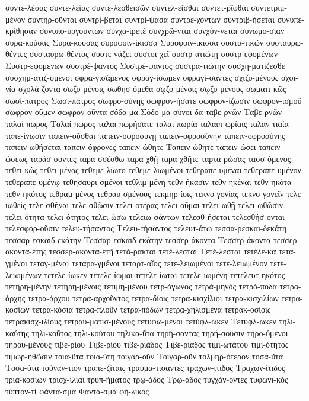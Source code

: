 {συντε-λέσας
συντε-λείας
συντε-λεσθεισῶν
συντελ-εῖσθαι
συντετ-ρῖφθαι
συντετριμ-μένον
συντηρ-οῦνται
συντρί-βεται
συντρί-ψασα
συντρε-χόντων
συντριβ-ήσεται
συνυπε-κρίθησαν
συνυπο-υργούντων
συνχα-ίρετέ
συνχρῶ-νται
συνχύν-νεται
συνωμο-σίαν
συρα-κούσας
Συρα-κούσας
συροφοιν-ίκισσα
Συροφοιν-ίκισσα
συστα-τικῶν
συσταυρω-θέντες
συσταυρω-θέντος
συστε-νάζει
συστοι-χεῖ
συστρ-ατιώτῃ
συστρ-εφομένων
Συστρ-εφομένων
συστρέ-ψαντος
Συστρέ-ψαντος
συστρα-τιώτην
συσχη-ματίζεσθε
συσχημ-ατιζ-όμενοι
σφρα-γισάμενος
σφραγ-ίσωμεν
σφραγί-σαντες
σχιζο-μένους
σχοι-νία
σχολά-ζοντα
σωζο-μένοις
σωθησ-όμεθα
σῳζο-μένοις
σῳζο-μένους
σωματι-κῶς
σωσί-πατρος
Σωσί-πατρος
σωφρο-σύνης
σωφρον-ήσατε
σωφρον-ίζωσιν
σωφρον-ισμοῦ
σωφρον-οῦμεν
σωφρον-οῦντα
σόδο-μα
Σόδο-μα
σύνοι-δα
ταβε-ρνῶν
Ταβε-ρνῶν
ταλαί-πωρος
Ταλαί-πωρος
ταλαι-πωρήσατε
ταλαι-πωρία
ταλαιπ-ωρίαις
ταλαν-τιαία
ταπε-ίνωσιν
ταπειν-οῦσθαι
ταπειν-οφροσύνῃ
ταπειν-οφροσύνην
ταπειν-οφροσύνης
ταπειν-ωθήσεται
ταπειν-όφρονες
ταπειν-ώθητε
Ταπειν-ώθητε
ταπειν-ώσει
ταπειν-ώσεως
ταράσ-σοντες
ταρα-σσέσθω
ταρα-χθῇ
ταρα-χθῆτε
ταρτα-ρώσας
τασσ-όμενος
τεθει-κώς
τεθει-μένος
τεθεμε-λίωτο
τεθεμε-λιωμένοι
τεθεραπε-υμέναι
τεθεραπε-υμένον
τεθεραπε-υμένῳ
τεθησαυρι-σμένοι
τεθλιμ-μένη
τεθν-ήκασιν
τεθν-ηκέναι
τεθν-ηκότα
τεθν-ηκότος
τεθραμ-μένος
τεθραυ-σμένους
τεκμηρ-ίοις
τεκνο-γονίας
τεκνο-γονεῖν
τελε-ιωθεὶς
τελε-σθῆναι
τελε-σθῶσιν
τελει-οτέρας
τελει-οῦμαι
τελει-ωθῇ
τελει-ωθῶσιν
τελει-ότητα
τελει-ότητος
τελει-ώσω
τελειω-σάντων
τελεσθ-ήσεται
τελεσθήσ-ονται
τελεσφορ-οῦσιν
τελευ-τήσαντος
Τελευ-τήσαντος
τελευτ-άτω
τεσσα-ρεσκαι-δεκάτη
τεσσαρ-εσκαιδ-εκάτην
Τεσσαρ-εσκαιδ-εκάτην
τεσσερ-άκοντα
Τεσσερ-άκοντα
τεσσερ-ακοντα-έτης
τεσσερ-ακοντα-ετῆ
τετά-ρακται
τετέ-λεσται
Τετέ-λεσται
τετέλε-κα
τετα-γμένοι
τεταγ-μέναι
τεταρα-γμένοι
τεταρτ-αῖος
τετε-λειωμένοι
τετε-λειωμένον
τετε-λειωμένων
τετελε-ίωκεν
τετελε-ίωμαι
τετελε-ίωται
τετελε-ιωμένη
τετελευτ-ηκότος
τετηρη-μένην
τετηρη-μένοις
τετιμη-μένου
τετρ-άγωνος
τετρά-μηνός
τετρά-ποδα
τετρα-άρχης
τετρα-άρχου
τετρα-αρχοῦντος
τετρα-δίοις
τετρα-κισχίλιοι
τετρα-κισχιλίων
τετρα-κοσίων
τετρα-κόσια
τετρα-πλοῦν
τετρα-πόδων
τετρα-χηλισμένα
τετρακ-οσίοις
τετρακισχ-ιλίους
τετραυ-ματισ-μένους
τετυφω-μένοι
τετύφλ-ωκεν
Τετύφλ-ωκεν
τηλι-καύτης
τηλι-κοῦτος
τηλι-κούτου
τηλικα-ῦτα
τηρή-σαντας
τηρή-σουσιν
τηρο-ύμενοι
τηρου-μένους
τιβε-ρίου
Τιβε-ρίου
τιβε-ριάδος
Τιβε-ριάδος
τιμι-ωτάτου
τιμι-ότητος
τιμωρ-ηθῶσιν
τοια-ῦτα
τοια-ύτη
τοιγαρ-οῦν
Τοιγαρ-οῦν
τολμηρ-ότερον
τοσα-ῦτα
Τοσα-ῦτα
τοὐναν-τίον
τραπε-ζίταις
τραυμα-τίσαντες
τραχων-ίτιδος
Τραχων-ίτιδος
τρια-κοσίων
τρισχ-ίλιαι
τρυπ-ήματος
τρῳ-άδος
Τρῳ-άδος
τυγχάν-οντες
τυφωνι-κὸς
τύπτον-τί
φάντα-σμά
Φάντα-σμά
φή-λικος
}
